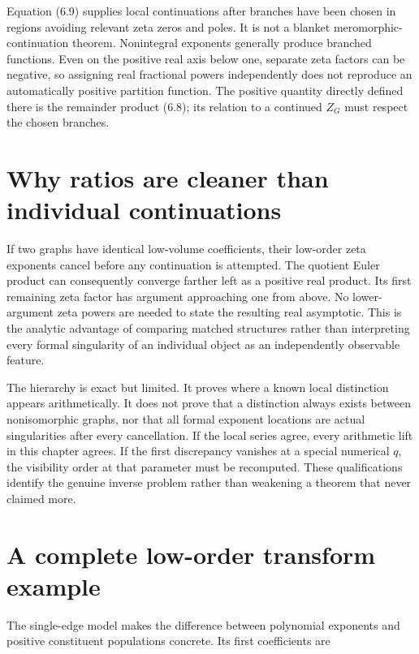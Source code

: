 \documentclass[
  11pt,
  a4paper,
]{report}
\begin{document}
Equation (6.9) supplies local continuations after branches have been
chosen in regions avoiding relevant zeta zeros and poles. It is not a
blanket meromorphic-continuation theorem. Nonintegral exponents
generally produce branched functions. Even on the positive real axis
below one, separate zeta factors can be negative, so assigning real
fractional powers independently does not reproduce an automatically
positive partition function. The positive quantity directly defined
there is the remainder product (6.8); its relation to a continued
\(Z_G\) must respect the chosen branches.

\hypertarget{why-ratios-are-cleaner-than-individual-continuations}{%
\section{Why ratios are cleaner than individual
continuations}\label{why-ratios-are-cleaner-than-individual-continuations}}

If two graphs have identical low-volume coefficients, their low-order
zeta exponents cancel before any continuation is attempted. The quotient
Euler product can consequently converge farther left as a positive real
product. Its first remaining zeta factor has argument approaching one
from above. No lower-argument zeta powers are needed to state the
resulting real asymptotic. This is the analytic advantage of comparing
matched structures rather than interpreting every formal singularity of
an individual object as an independently observable feature.

The hierarchy is exact but limited. It proves where a known local
distinction appears arithmetically. It does not prove that a distinction
always exists between nonisomorphic graphs, nor that all formal exponent
locations are actual singularities after every cancellation. If the
local series agree, every arithmetic lift in this chapter agrees. If the
first discrepancy vanishes at a special numerical \(q\), the visibility
order at that parameter must be recomputed. These qualifications
identify the genuine inverse problem rather than weakening a theorem
that never claimed more.

\hypertarget{a-complete-low-order-transform-example}{%
\section{A complete low-order transform
example}\label{a-complete-low-order-transform-example}}

The single-edge model makes the difference between polynomial exponents
and positive constituent populations concrete. Its first coefficients
are
\end{document}
